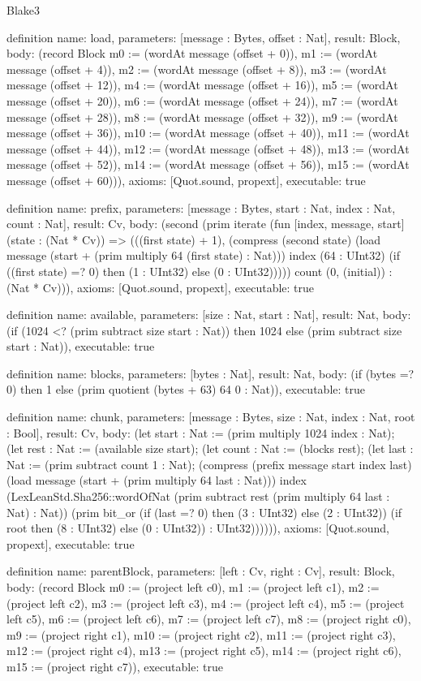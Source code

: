 \begin{lexlean}{Blake3}
\begin{semanticmodule}
definition{
  name: load,
  parameters: [message : Bytes, offset : Nat],
  result: Block,
  body: (record Block {m0 := (wordAt message (offset + 0)), m1 := (wordAt message (offset + 4)), m2 := (wordAt message (offset + 8)), m3 := (wordAt message (offset + 12)), m4 := (wordAt message (offset + 16)), m5 := (wordAt message (offset + 20)), m6 := (wordAt message (offset + 24)), m7 := (wordAt message (offset + 28)), m8 := (wordAt message (offset + 32)), m9 := (wordAt message (offset + 36)), m10 := (wordAt message (offset + 40)), m11 := (wordAt message (offset + 44)), m12 := (wordAt message (offset + 48)), m13 := (wordAt message (offset + 52)), m14 := (wordAt message (offset + 56)), m15 := (wordAt message (offset + 60))}),
  axioms: [Quot.sound, propext],
  executable: true
}

definition{
  name: prefix,
  parameters: [message : Bytes, start : Nat, index : Nat, count : Nat],
  result: Cv,
  body: (second (prim iterate (fun [index, message, start] (state : (Nat * Cv)) => (((first state) + 1), (compress (second state) (load message (start + (prim multiply 64 (first state) : Nat))) index (64 : UInt32) (if ((first state) =? 0) then (1 : UInt32) else (0 : UInt32))))) count (0, (initial)) : (Nat * Cv))),
  axioms: [Quot.sound, propext],
  executable: true
}

definition{
  name: available,
  parameters: [size : Nat, start : Nat],
  result: Nat,
  body: (if (1024 <? (prim subtract size start : Nat)) then 1024 else (prim subtract size start : Nat)),
  executable: true
}

definition{
  name: blocks,
  parameters: [bytes : Nat],
  result: Nat,
  body: (if (bytes =? 0) then 1 else (prim quotient (bytes + 63) 64 0 : Nat)),
  executable: true
}

definition{
  name: chunk,
  parameters: [message : Bytes, size : Nat, index : Nat, root : Bool],
  result: Cv,
  body: (let start : Nat := (prim multiply 1024 index : Nat); (let rest : Nat := (available size start); (let count : Nat := (blocks rest); (let last : Nat := (prim subtract count 1 : Nat); (compress (prefix message start index last) (load message (start + (prim multiply 64 last : Nat))) index (LexLeanStd.Sha256::wordOfNat (prim subtract rest (prim multiply 64 last : Nat) : Nat)) (prim bit_or (if (last =? 0) then (3 : UInt32) else (2 : UInt32)) (if root then (8 : UInt32) else (0 : UInt32)) : UInt32)))))),
  axioms: [Quot.sound, propext],
  executable: true
}

definition{
  name: parentBlock,
  parameters: [left : Cv, right : Cv],
  result: Block,
  body: (record Block {m0 := (project left c0), m1 := (project left c1), m2 := (project left c2), m3 := (project left c3), m4 := (project left c4), m5 := (project left c5), m6 := (project left c6), m7 := (project left c7), m8 := (project right c0), m9 := (project right c1), m10 := (project right c2), m11 := (project right c3), m12 := (project right c4), m13 := (project right c5), m14 := (project right c6), m15 := (project right c7)}),
  executable: true
}


\end{semanticmodule}
\end{lexlean}
